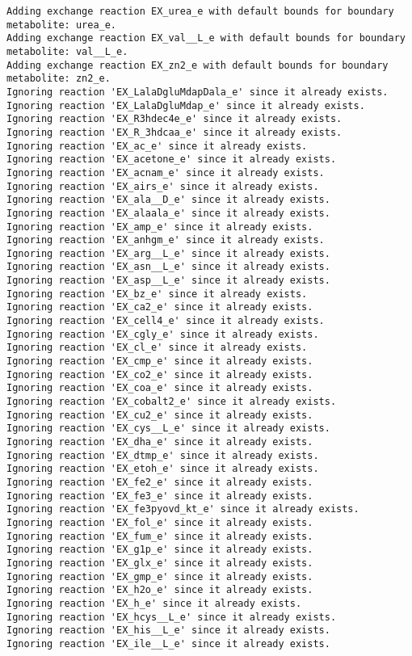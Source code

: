 \documentclass[
  letterpaper,
  DIV=11,
  numbers=noendperiod]{scrartcl}
\begin{document}
\begin{verbatim}
Adding exchange reaction EX_urea_e with default bounds for boundary metabolite: urea_e.
Adding exchange reaction EX_val__L_e with default bounds for boundary metabolite: val__L_e.
Adding exchange reaction EX_zn2_e with default bounds for boundary metabolite: zn2_e.
Ignoring reaction 'EX_LalaDgluMdapDala_e' since it already exists.
Ignoring reaction 'EX_LalaDgluMdap_e' since it already exists.
Ignoring reaction 'EX_R3hdec4e_e' since it already exists.
Ignoring reaction 'EX_R_3hdcaa_e' since it already exists.
Ignoring reaction 'EX_ac_e' since it already exists.
Ignoring reaction 'EX_acetone_e' since it already exists.
Ignoring reaction 'EX_acnam_e' since it already exists.
Ignoring reaction 'EX_airs_e' since it already exists.
Ignoring reaction 'EX_ala__D_e' since it already exists.
Ignoring reaction 'EX_alaala_e' since it already exists.
Ignoring reaction 'EX_amp_e' since it already exists.
Ignoring reaction 'EX_anhgm_e' since it already exists.
Ignoring reaction 'EX_arg__L_e' since it already exists.
Ignoring reaction 'EX_asn__L_e' since it already exists.
Ignoring reaction 'EX_asp__L_e' since it already exists.
Ignoring reaction 'EX_bz_e' since it already exists.
Ignoring reaction 'EX_ca2_e' since it already exists.
Ignoring reaction 'EX_cell4_e' since it already exists.
Ignoring reaction 'EX_cgly_e' since it already exists.
Ignoring reaction 'EX_cl_e' since it already exists.
Ignoring reaction 'EX_cmp_e' since it already exists.
Ignoring reaction 'EX_co2_e' since it already exists.
Ignoring reaction 'EX_coa_e' since it already exists.
Ignoring reaction 'EX_cobalt2_e' since it already exists.
Ignoring reaction 'EX_cu2_e' since it already exists.
Ignoring reaction 'EX_cys__L_e' since it already exists.
Ignoring reaction 'EX_dha_e' since it already exists.
Ignoring reaction 'EX_dtmp_e' since it already exists.
Ignoring reaction 'EX_etoh_e' since it already exists.
Ignoring reaction 'EX_fe2_e' since it already exists.
Ignoring reaction 'EX_fe3_e' since it already exists.
Ignoring reaction 'EX_fe3pyovd_kt_e' since it already exists.
Ignoring reaction 'EX_fol_e' since it already exists.
Ignoring reaction 'EX_fum_e' since it already exists.
Ignoring reaction 'EX_g1p_e' since it already exists.
Ignoring reaction 'EX_glx_e' since it already exists.
Ignoring reaction 'EX_gmp_e' since it already exists.
Ignoring reaction 'EX_h2o_e' since it already exists.
Ignoring reaction 'EX_h_e' since it already exists.
Ignoring reaction 'EX_hcys__L_e' since it already exists.
Ignoring reaction 'EX_his__L_e' since it already exists.
Ignoring reaction 'EX_ile__L_e' since it already exists.

\end{verbatim}
\end{document}

